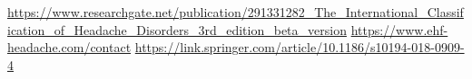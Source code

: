\begin{thebibliography}{10}
     \url{https://www.researchgate.net/publication/291331282_The_International_Classification_of_Headache_Disorders_3rd_edition_beta_version}
     \url{https://www.ehf-headache.com/contact}
     \url{https://link.springer.com/article/10.1186/s10194-018-0909-4}
\end{thebibliography}